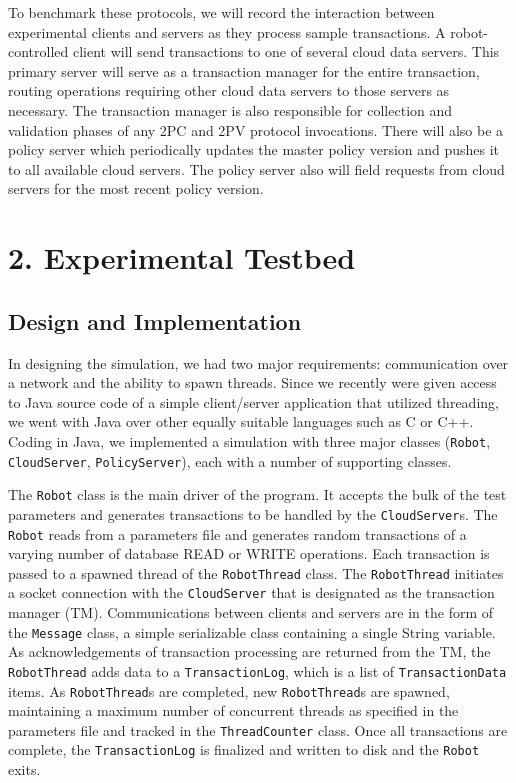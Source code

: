 \documentclass[11pt]{article}
\begin{document}
To benchmark these protocols, we will record the interaction between experimental clients and servers as they process sample transactions. A robot-controlled client will send transactions to one of several cloud data servers. This primary server will serve as a transaction manager for the entire transaction, routing operations requiring other cloud data servers to those servers as necessary. The transaction manager is also responsible for collection and validation phases of any 2PC and 2PV protocol invocations. There will also be a policy server which periodically updates the master policy version and pushes it to all available cloud servers. The policy server also will field requests from cloud servers for the most recent policy version.
\section{2. Experimental Testbed}
\subsection{Design and Implementation}
In designing the simulation, we had two major requirements: communication over a network and the ability to spawn threads. Since we recently were given access to Java source code of a simple client/server application that utilized threading, we went with Java over other equally suitable languages such as C or C++. Coding in Java, we implemented a simulation with three major classes (\texttt{Robot}, \texttt{CloudServer}, \texttt{PolicyServer}), each with a number of supporting classes.

The \texttt{Robot} class is the main driver of the program. It accepts the bulk of the test parameters and generates transactions to be handled by the \texttt{CloudServer}s. The \texttt{Robot} reads from a parameters file and generates random transactions of a varying number of database READ or WRITE operations. Each transaction is passed to a spawned thread of the \texttt{RobotThread} class. The \texttt{RobotThread} initiates a socket connection with the \texttt{CloudServer} that is designated as the transaction manager (TM). Communications between clients and servers are in the form of the \texttt{Message} class, a simple serializable class containing a single String variable. As acknowledgements of transaction processing are returned from the TM, the \texttt{RobotThread} adds data to a \texttt{TransactionLog}, which is a list of \texttt{TransactionData} items. As \texttt{RobotThread}s are completed, new \texttt{RobotThread}s are spawned, maintaining a maximum number of concurrent threads as specified in the parameters file and tracked in the \texttt{ThreadCounter} class. Once all transactions are complete, the \texttt{TransactionLog} is finalized and written to disk and the \texttt{Robot} exits.
\end{document}
